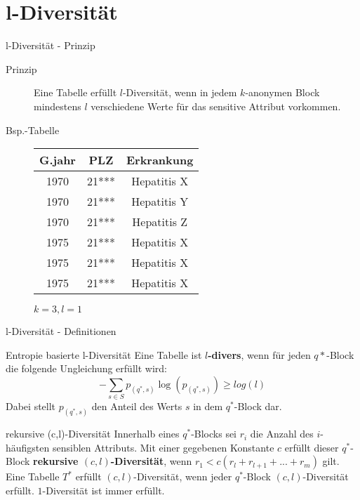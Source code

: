 \section{l-Diversität}

\begin{frame}{l-Diversität - Prinzip}

\begin{description}
	\item[Prinzip] Eine Tabelle erfüllt \(l\)-Diversität, wenn in jedem \(k\)-anonymen Block mindestens \(l\) verschiedene Werte für das sensitive Attribut vorkommen.
    
    \vspace{1.0cm}
    
    \item[Bsp.-Tabelle]
    \small
	\begin{tabular}{|c|c|c|}
	\hline \textbf{G.jahr} & \textbf{PLZ} & \textbf{Erkrankung} \\
	\hline
     1970 & 21*** & Hepatitis X \\ 
	 1970 & 21*** & Hepatitis Y \\ 
	 1970 & 21*** & Hepatitis Z \\
	\hline 
     1975 & 21*** & Hepatitis X \\
     1975 & 21*** & Hepatitis X \\ 
	 1975 & 21*** & Hepatitis X \\ 
	\hline 
	\end{tabular}
	\vspace{0.3cm}

	\(k = 3, l = 1\)
\end{description}

\end{frame}


\begin{frame}{l-Diversität - Definitionen}
	\begin{block}{Entropie basierte l-Diversität \tiny \cite{machanavajjhala_l_diversity}}
        Eine Tabelle ist \textbf{\(l\)-divers}, wenn für jeden $q*$-Block die folgende Ungleichung erfüllt wird:
    	\[- \sum\limits_{s \in S} p_{(q^*,s)} \log(p_{(q^*,s)}) \geq log(l)\]
    	Dabei stellt $p_{(q^*,s)}$ den Anteil des Werts $s$ in dem $q^*$-Block dar.
   \end{block}
    
    \vfill
    
	\begin{block}{rekursive (c,l)-Diversität \tiny \cite{machanavajjhala_l_diversity}}
		Innerhalb eines $q^*$-Blocks sei $r_i$ die Anzahl des $i$-häufigsten sensiblen Attributs. Mit einer gegebenen Konstante $c$ erfüllt dieser $q^*$-Block \textbf{rekursive $(c, l)$-Diversität}, wenn $r_1 < c(r_l + r_{l+1} + ...  + r_m )$ gilt. Eine Tabelle $T^*$ erfüllt $(c, l)$-Diversität, wenn jeder $q^*$-Block $(c, l)$-Diversität erfüllt. $1$-Diversität ist immer erfüllt.
    \end{block}
\end{frame}


